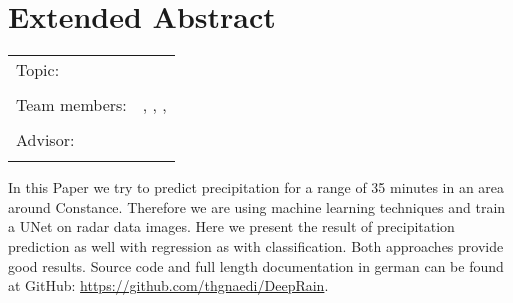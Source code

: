 \chapter*{Extended Abstract}

\begin{center}
	\begingroup
	\renewcommand*{\arraystretch}{1}
	{\makeatletter	
		\begin{tabular}{p{3.2cm}p{9.6cm}}
			Topic: & \thema \\
			& \\
			Team members: & \verfasserA, \verfasserB, \verfasserC, \verfasserD \\
			& \\
			Advisor: & \hoschschule \newline \institut \newline \prueferA \\
			& \\
		\end{tabular}
		
		\makeatother}
	\endgroup
\end{center}

\bigskip

In this Paper we try to predict precipitation for a range of 35 minutes in an area around Constance.
Therefore we are using machine learning techniques and train a UNet on radar data images. 
Here we present the result of precipitation prediction as well with regression as with classification. 
Both approaches provide good results. Source code and full length documentation in german can be found at GitHub: \url{https://github.com/thgnaedi/DeepRain}.


\printbibliography[title={References}, heading=subbibliography]


